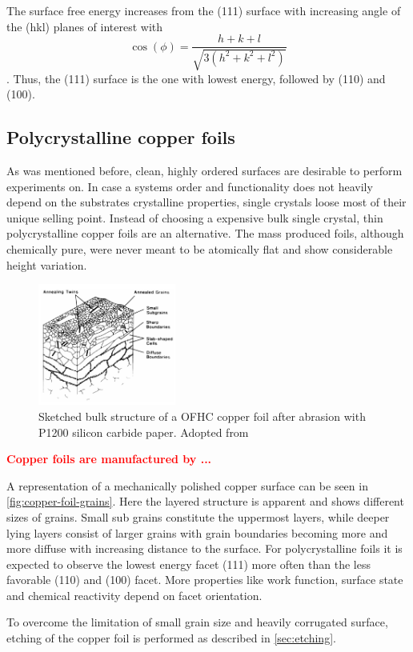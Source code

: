 The surface free energy increases from the (111) surface with increasing angle of the (hkl) planes of interest with $$\cos(\phi)=\frac{h+k+l}{\sqrt{3(h^2+k^2+l^2)}}$$ \cite{jian-min_calculation_2004}. Thus, the (111) surface is the one with lowest energy, followed by (110) and (100). 

 \subsection{Polycrystalline copper foils}
 
  As was mentioned before, clean, highly ordered surfaces are desirable to perform experiments on. In case a systems order and functionality does not heavily depend on the substrates crystalline properties, single crystals loose most of their unique selling point. Instead of choosing a expensive bulk single crystal, thin polycrystalline copper foils are an alternative. The mass produced foils, although chemically pure, were never meant to be atomically flat and show considerable height variation.

\begin{figure}\centering
	\includegraphics[height=40mm]{./images/grain-structure-copper-foil}
	\caption{Sketched bulk structure of a OFHC copper foil after abrasion with P1200 silicon carbide paper. Adopted from \cite{turley_nature_1981}}
	\label{fig:copper-foil-grains}
\end{figure}

\textcolor{red}{\textbf{Copper foils are manufactured by ...}}

 A representation of a mechanically polished copper surface can be seen in \autoref{fig:copper-foil-grains}. Here the layered structure is apparent and shows different sizes of grains. Small sub grains constitute the uppermost layers, while deeper lying layers consist of larger grains with grain boundaries becoming more and more diffuse with increasing distance to the surface. For polycrystalline foils it is expected to observe the lowest energy facet (111) more often than the less favorable (110) and (100) facet. More properties like work function, surface state and chemical reactivity depend on facet orientation.
 
To overcome the limitation of small grain size and heavily corrugated surface, etching of the copper foil is performed as described in \autoref{sec:etching}.